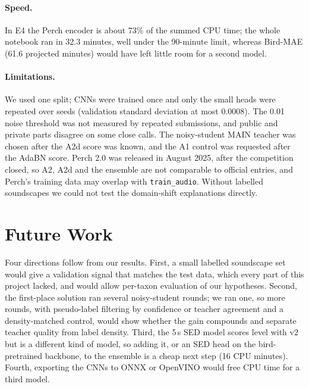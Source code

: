 \documentclass[letterpaper]{article} %
\begin{document}
\paragraph{Speed.} In E4 the Perch encoder is about 73\% of the summed CPU time; the whole notebook ran in 32.3 minutes, well under the 90-minute limit, whereas Bird-MAE (61.6 projected minutes) would have left little room for a second model.

\paragraph{Limitations.} We used one split; CNNs were trained once and only the small heads were repeated over seeds (validation standard deviation at most 0.0008). The 0.01 noise threshold was not measured by repeated submissions, and public and private parts disagree on some close calls. The noisy-student MAIN teacher was chosen after the A2d score was known, and the A1 control was requested after the AdaBN score. Perch 2.0 was released in August 2025, after the competition closed, so A2, A2d and the ensemble are not comparable to official entries, and Perch's training data may overlap with \texttt{train\_audio}. Without labelled soundscapes we could not test the domain-shift explanations directly.

\section{Future Work}
Four directions follow from our results. First, a small labelled soundscape set would give a validation signal that matches the test data, which every part of this project lacked, and would allow per-taxon evaluation of our hypotheses. Second, the first-place solution ran several noisy-student rounds; we ran one, so more rounds, with pseudo-label filtering by confidence or teacher agreement and a density-matched control, would show whether the gain compounds and separate teacher quality from label density. Third, the 5\,s SED model scores level with v2 but is a different kind of model, so adding it, or an SED head on the bird-pretrained backbone, to the ensemble is a cheap next step (16 CPU minutes). Fourth, exporting the CNNs to ONNX or OpenVINO would free CPU time for a third model.
\end{document}
